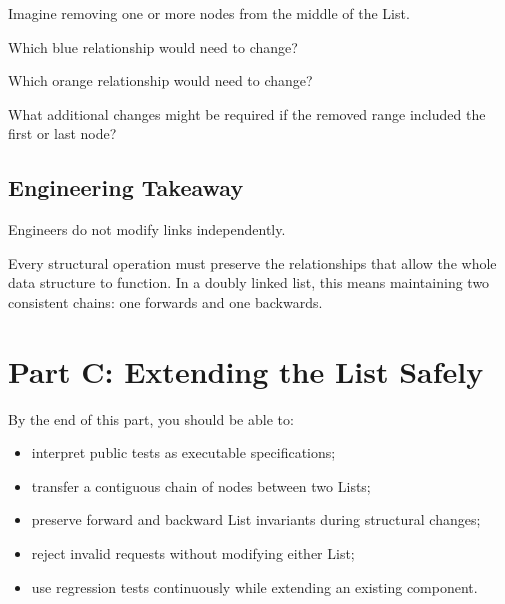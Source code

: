 \documentclass{csc2059practical}
\begin{document}
\begin{reflectionbox}
Imagine removing one or more nodes from the middle of the List.

Which blue relationship would need to change?

Which orange relationship would need to change?

What additional changes might be required if the removed range included the first or last node?
\end{reflectionbox}

\subsection{Engineering Takeaway}

\begin{importantnote}
Engineers do not modify links independently.

Every structural operation must preserve the relationships that allow the whole data structure to function. In a doubly linked list, this means maintaining two consistent chains: one forwards and one backwards.
\end{importantnote}


\section{Part C: Extending the List Safely}

\begin{learningoutcomes}
By the end of this part, you should be able to:

\begin{itemize}
    \item interpret public tests as executable specifications;
    \item transfer a contiguous chain of nodes between two Lists;
    \item preserve forward and backward List invariants during structural changes;
    \item reject invalid requests without modifying either List;
    \item use regression tests continuously while extending an existing component.
\end{itemize}
\end{learningoutcomes}
\end{document}

